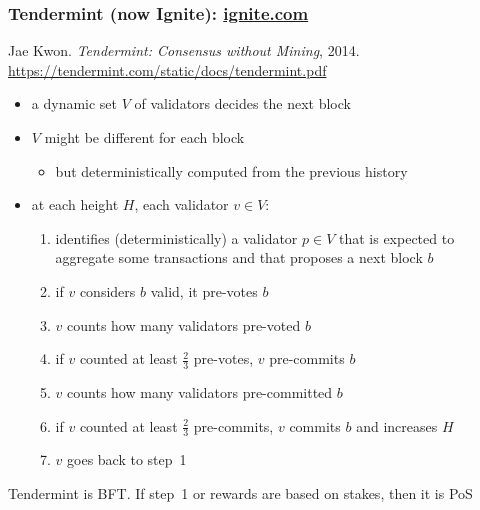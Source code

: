 \documentclass[11pt]{beamer}  %
\begin{document}
\begin{frame}\frametitle{Tendermint (now Ignite): \url{ignite.com}}

  \begin{greenbox}{Jae Kwon. \emph{Tendermint: Consensus without Mining}, 2014.\\
    \url{https://tendermint.com/static/docs/tendermint.pdf}}
    \begin{itemize}
    \item a dynamic set $V$ of validators decides the next block
    \item $V$ might be different for each block
      \begin{itemize}
      \item but deterministically computed from the previous history
      \end{itemize}
    \item at each height $H$, each validator $v\in V$:
      \begin{enumerate}
      \item identifies (deterministically) a validator $p\in V$ that
        is expected to aggregate some transactions and that \alert{proposes} a next block $b$
      \item if $v$ considers $b$ valid, it \alert{pre-votes} $b$
      \item $v$ counts how many validators pre-voted $b$
      \item if $v$ counted at least $\frac{2}{3}$ pre-votes, $v$ \alert{pre-commits} $b$
      \item $v$ counts how many validators pre-committed $b$
      \item if $v$ counted at least $\frac{2}{3}$ pre-commits, $v$ \alert{commits} $b$ and increases $H$
      \item $v$ goes back to step~1
      \end{enumerate}
    \end{itemize}
  \end{greenbox}

  \smallskip

  \begin{center}
    Tendermint is BFT. If step~1 or rewards are based on stakes, then it is PoS
  \end{center}

\end{frame}
\end{document}
